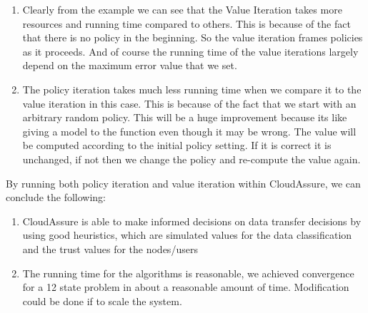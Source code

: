 \begin{enumerate}
    \item Clearly from the example we can see that the Value Iteration takes
more resources and running time compared to others. This is because of the fact
that there is no policy in the beginning. So the value iteration frames policies
as it proceeds. And of course the running time of the value iterations largely
depend on the maximum error value that we set.
    \item The policy iteration takes much less running time when we compare it to the
value iteration in this case. This is because of the fact that we start with an
arbitrary random policy. This will be a huge improvement because its like giving
a model to the function even though it may be wrong. The value will be computed
according to the initial policy setting. If it is correct it is unchanged, if
not then we change the policy and re-compute the value again.
\end{enumerate}
By running both policy iteration and value iteration within CloudAssure, we can conclude the following:
\begin{enumerate}
    \item CloudAssure is able to make informed decisions on data transfer decisions by
using good heuristics, which are simulated values for the data
classification and the trust values for the nodes/users
    \item The running time for
the algorithms is reasonable, we achieved convergence for a 12 state problem in
about a reasonable amount of time. Modification could be done if to scale the system.
\end{enumerate}
